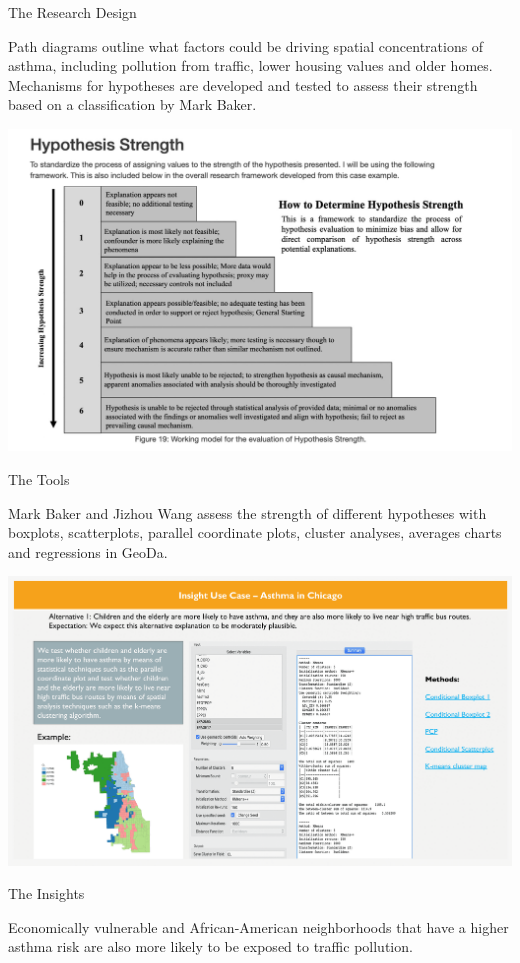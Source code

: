 \documentclass[
]{book}
\begin{document}
The Research Design

Path diagrams outline what factors could be driving spatial concentrations of asthma, including pollution from traffic, lower housing values and older homes. Mechanisms for hypotheses are developed and tested to assess their strength based on a classification by Mark Baker.

\includegraphics{images/asthma3.jpg}

The Tools

Mark Baker and Jizhou Wang assess the strength of different hypotheses with boxplots, scatterplots, parallel coordinate plots, cluster analyses, averages charts and regressions in GeoDa.

\includegraphics{images/asthma4.png}

The Insights

Economically vulnerable and African-American neighborhoods that have a higher asthma risk are also more likely to be exposed to traffic pollution.
\end{document}
